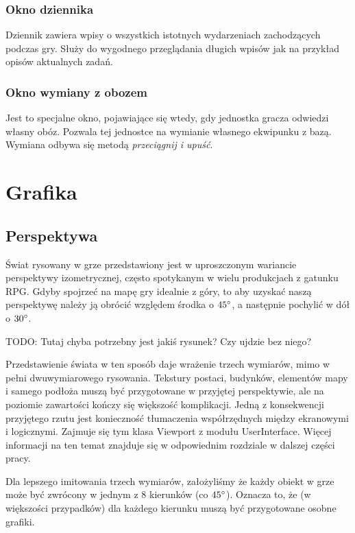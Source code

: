\documentclass[licencjacka]{pracamgr}
\begin{document}
      \subsubsection{Okno dziennika}
      Dziennik zawiera wpisy o wszystkich istotnych wydarzeniach zachodzących podczas gry. Służy do wygodnego przeglądania długich wpisów jak na przykład
      opisów aktualnych zadań.
      \subsubsection{Okno wymiany z obozem}
      Jest to specjalne okno, pojawiające się wtedy, gdy jednostka gracza odwiedzi własny obóz. Pozwala tej jednostce na wymianie własnego ekwipunku z bazą.
      Wymiana odbywa się metodą \emph{przeciągnij i upuść}.


  \section{Grafika}
    \subsection{Perspektywa}
    Świat rysowany w grze przedstawiony jest w uproszczonym wariancie perspektywy izometrycznej, często spotykanym w
    wielu produkcjach z gatunku RPG. Gdyby spojrzeć na mapę gry idealnie z góry, to aby uzyskać naszą perspektywę należy
    ją obrócić względem środka o $45\degree$, a następnie pochylić w dół o $30\degree$.

    TODO: Tutaj chyba potrzebny jest jakiś rysunek? Czy ujdzie bez niego?

    Przedstawienie świata w ten sposób daje wrażenie trzech wymiarów, mimo w pełni dwuwymiarowego rysowania. Tekstury
    postaci, budynków, elementów mapy i samego podłoża muszą być przygotowane w przyjętej perspektywie, ale na poziomie
    zawartości kończy się większość komplikacji. Jedną z konsekwencji przyjętego rzutu jest konieczność tłumaczenia
    współrzędnych między ekranowymi i logicznymi. Zajmuje się tym klasa Viewport z modułu UserInterface. Więcej
    informacji na ten temat znajduje się w odpowiednim rozdziale w dalszej części pracy.

    Dla lepszego imitowania trzech wymiarów, założyliśmy że każdy obiekt w grze może być zwrócony w jednym z 8 kierunków
    (co $45\degree$). Oznacza to, że (w większości przypadków) dla każdego kierunku muszą być przygotowane osobne
    grafiki.
\end{document}
